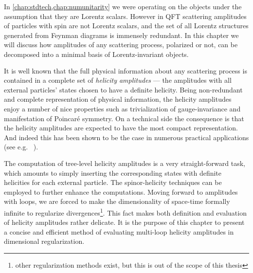 In \cref{chap:stdtech,chap:numunitarity} we were operating on the objects under the assumption that they are Lorentz scalars.
However in QFT scattering amplitudes of particles with spin are not Lorentz scalars,
and the set of all Lorentz structures generated from Feynman diagrams is immensely redundant.
In this chapter we will discuss how amplitudes of any scattering process, 
polarized or not, can be decomposed into a minimal basis of Lorentz-invariant objects.

It is well known that the full physical information about any scattering process is contained in a complete set of \textit{helicity amplitudes} ---
the amplitudes with all external particles' states chosen to have a definite helicity.
Being non-redundant and complete representation of physical information, the helicity amplitudes 
enjoy a number of nice properties such as trivialization of gauge-invariance and manifestation of Poincaré symmetry.
On a technical side the consequence is that the helicity amplitudes are expected to have the most compact representation.
And indeed this has been shown to be the case in numerous practical applications (see e.g.\ %
\cite{DeLaurentis:2019phz,Badger:2019djh,Badger:2011yu,Badger:2013gxa,DeFreitas:2004kmi,Gehrmann:2011aa,Gehrmann:2009vu,Glover:2004si,Glover:2003cm,Garland:2002ak,Dunbar:2016aux,Dunbar:2016gjb,Dunbar:2016cxp,Badger:2015lda,Gehrmann:2015bfy,Bern:2003ck,Bern:2002tk,Badger:2018enw,Dunbar2017,Kunszt:1994nq}).

The computation of tree-level helicity amplitudes is a very straight-forward task,
which amounts to simply inserting the corresponding states with definite helicities for each external particle.
The spinor-helicity techniques can be employed to further enhance the computations.
Moving forward to amplitudes with loops,
we are forced to make the dimensionality of space-time formally infinite \cite{Collins:1984xc} 
to regularize divergences\footnote{other regularization methods exist, but this is out of the scope of this thesis}.
This fact makes both definition and evaluation of helicity amplitudes rather delicate.
It is the purpose of this chapter to present a concise and efficient method of
evaluating multi-loop helicity amplitudes in dimensional regularization. 

